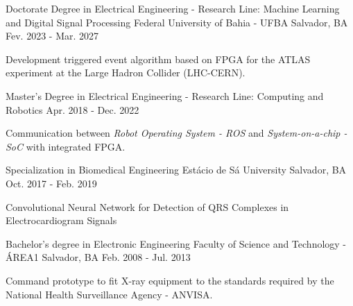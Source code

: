 

\begin{cventries}

  \cventry
    {Doctorate Degree in Electrical Engineering - Research Line: Machine Learning and Digital Signal Processing} %
    {Federal University of Bahia - UFBA} %
    {Salvador, BA} %
    {Fev. 2023 - Mar. 2027} %
    {
      \begin{cvitems} %
        \item {Development triggered event algorithm based on FPGA for the ATLAS experiment at the Large Hadron Collider (LHC-CERN).}
      \end{cvitems}
    }


  \cventry
    {Master's Degree in Electrical Engineering - Research Line: Computing and Robotics} %
    {} %
    {} %
    {Apr. 2018 - Dec. 2022} %
    {
      \begin{cvitems} %
        \item {Communication between \textit{Robot Operating System - ROS} and \textit{System-on-a-chip - SoC} with integrated FPGA.}
      \end{cvitems}
    }


  \cventry
    {Specialization in Biomedical Engineering} %
    {Estácio de Sá University} %
    {Salvador, BA} %
    {Oct. 2017 - Feb. 2019} %
    {
      \begin{cvitems} %
        \item {Convolutional Neural Network for Detection of QRS Complexes in Electrocardiogram Signals}
      \end{cvitems}
    }


  \cventry
    {Bachelor's degree in Electronic Engineering} %
    {Faculty of Science and Technology - ÁREA1} %
    {Salvador, BA} %
    {Feb. 2008 - Jul. 2013} %
    {
      \begin{cvitems} %
        \item {Command prototype to fit X-ray equipment to the standards required by the National Health Surveillance Agency - ANVISA.}
      \end{cvitems}
    }

\end{cventries}
